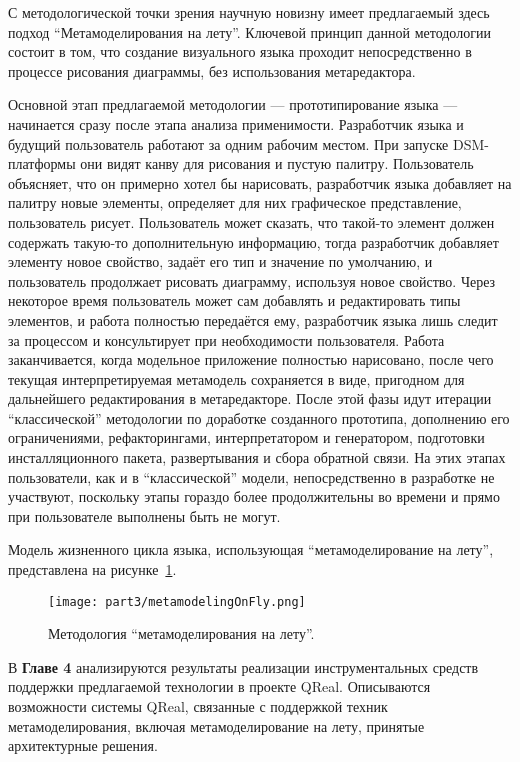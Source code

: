 С методологической точки зрения научную новизну имеет предлагаемый здесь подход 
"`Метамоделирования на лету"'. Ключевой принцип данной методологии состоит в том, 
что создание визуального языка проходит непосредственно в процессе рисования диаграммы, 
без использования метаредактора.

Основной этап предлагаемой методологии --- прототипирование языка --- начинается сразу 
после этапа анализа применимости. Разработчик языка и будущий пользователь работают 
за одним рабочим местом. При запуске DSM-платформы они видят канву для рисования и 
пустую палитру. Пользователь объясняет, что он примерно хотел бы нарисовать, разработчик 
языка добавляет на палитру новые элементы, определяет для них графическое представление, 
пользователь рисует. Пользователь может сказать, что такой-то элемент должен содержать 
такую-то дополнительную информацию, тогда разработчик добавляет элементу новое свойство, 
задаёт его тип и значение по умолчанию, и пользователь продолжает рисовать диаграмму, 
используя новое свойство. Через некоторое время пользователь может сам добавлять и 
редактировать типы элементов, и работа полностью передаётся ему, разработчик языка 
лишь следит за процессом и консультирует при необходимости пользователя. Работа заканчивается, 
когда модельное приложение полностью нарисовано, после чего текущая интерпретируемая 
метамодель сохраняется в виде, пригодном для дальнейшего редактирования в метаредакторе. 
После этой фазы идут итерации "`классической"' методологии по доработке созданного 
прототипа, дополнению его ограничениями, рефакторингами, интерпретатором и генератором, 
подготовки инсталляционного пакета, развертывания и сбора обратной связи. На этих этапах 
пользователи, как и в "`классической"' модели, непосредственно в разработке не участвуют, 
поскольку этапы гораздо более продолжительны во времени и прямо при пользователе выполнены 
быть не могут.

Модель жизненного цикла языка, использующая "`метамоделирование на лету"', представлена 
на рисунке~\ref{metamodelingOnFly}.

\begin{figure} [ht]
	\begin{center}
		\texttt{[image: part3/metamodelingOnFly.png]}
		\caption{Методология "`метамоделирования на лету"'.}
		\label{metamodelingOnFly}
	\end{center}
\end{figure}

В \textbf{Главе 4} анализируются результаты реализации инструментальных средств поддержки предлагаемой 
технологии в проекте QReal. Описываются возможности системы QReal, связанные с поддержкой 
техник метамоделирования, включая метамоделирование на лету, принятые архитектурные 
решения.

